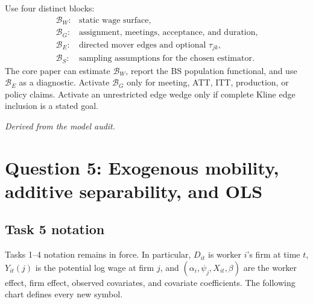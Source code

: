 \documentclass[11pt]{article}
\begin{document}
Use four distinct blocks:
\[
\boxed{
\begin{array}{ll}
\mathcal B_W:&\text{static wage surface},\\
\mathcal B_G:&\text{assignment, meetings, acceptance, and duration},\\
\mathcal B_E:&\text{directed mover edges and optional }\tau_{jk},\\
\mathcal B_S:&\text{sampling assumptions for the chosen estimator}.
\end{array}}
\tag{T4.32}
\]
The core paper can estimate \(\mathcal B_W\), report the BS population
functional, and use \(\mathcal B_E\) as a diagnostic.  Activate
\(\mathcal B_G\) only for meeting, ATT, ITT,
production, or policy claims.  Activate an unrestricted edge wedge only if
complete Kline edge inclusion is a stated goal.

\textit{Derived from the model audit.}

\section{Question 5: Exogenous mobility, additive separability, and OLS}

\subsection{Task 5 notation}

Tasks 1--4 notation remains in force.  In particular, \(D_{it}\) is worker
\(i\)'s firm at time \(t\), \(Y_{it}(j)\) is the potential log wage at firm
\(j\), and \((\alpha_i,\psi_j,X_{it},\beta)\) are the worker effect, firm
effect, observed covariates, and covariate coefficients.  The following chart
defines every new symbol.
\end{document}
